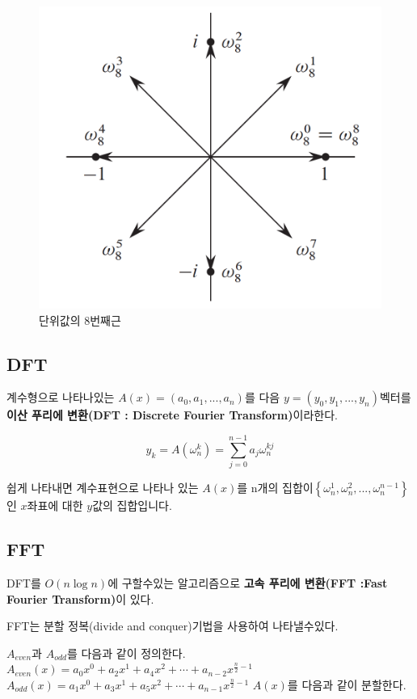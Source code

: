 \documentclass{oblivoir}
\begin{document}
\begin{figure}[h!]
    \centering
    \includegraphics[scale=0.3]{pic2.png}
    \caption{단위값의 8번째근}
\end{figure}

\subsection{DFT}

계수형으로 나타나있는 $A(x) = (a_0,a_1,...,a_n)$를 다음 $y = (y_0,y_1,...,y_n) $벡터를 \textbf{이산 푸리에 변환(DFT : Discrete Fourier Transform)}이라한다.

$$ y_k = A(\omega^k_n) = \sum_{j=0}^{n-1} a_j\omega_{n}^{kj}$$

쉽게 나타내면 계수표현으로 나타나 있는 $A(x)$를 n개의 집합이$\left\{\omega_n^1, \omega_n^2 , ... , \omega_n^{n-1}\right\}$인 $x$좌표에 대한 $y$값의 집합입니다.

\subsection{FFT}
DFT를 $O(n \log n)$에 구할수있는 알고리즘으로 \textbf{고속 푸리에 변환(FFT :Fast Fourier Transform)}이 있다. 

FFT는 분할 정복(divide and conquer)기법을 사용하여 나타낼수있다.

$A_{even}$과 $A_{odd}$를 다음과 같이 정의한다.
$A_{even}(x) = a_0x^0 + a_2x^1 + a_4x^2 + \cdots + a_{n-2}x^{ \frac{n}{2}-1} $
$A_{odd}(x) = a_1x^0 + a_3x^1 + a_5x^2 + \cdots + a_{n-1}x^{\frac{n}{2}-1} $
$A(x)$를 다음과 같이 분할한다.
\end{document}
